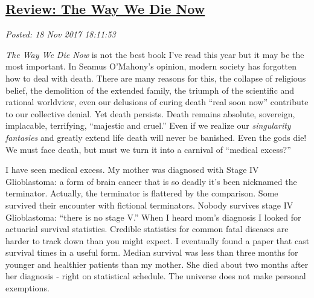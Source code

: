 %

\subsection*{\href{http://analyzethedatanotthedrivel.org/2017/11/18/review-the-way-we-die-now/}{Review: The Way We Die Now}}


\noindent\emph{Posted: 18 Nov 2017 18:11:53}
\vspace{6pt}




\emph{The Way We Die Now} is not the best book I've read this year but it
may be the most important. In Seamus O'Mahony's opinion, modern society
has forgotten how to deal with death. There are many reasons for this,
the collapse of religious belief, the demolition of the extended family,
the triumph of the scientific and rational worldview, even our delusions
of curing death ``real soon now'' contribute to our collective denial.
Yet death persists. Death remains absolute, sovereign, implacable,
terrifying, ``majestic and cruel.'' Even if we realize our
\emph{singularity fantasies} and greatly extend life death will never be
banished. Even the gods die! We must face death, but must we turn it
into a carnival of ``medical excess?''

I have seen medical excess. My mother was diagnosed with Stage IV
Glioblastoma: a form of brain cancer that is so deadly it's been
nicknamed the terminator. Actually, the terminator is flattered by the
comparison. Some survived their encounter with fictional terminators.
Nobody survives stage IV Glioblastoma: ``there is no stage V.'' When I
heard mom's diagnosis I looked for actuarial survival statistics.
Credible statistics for common fatal diseases are harder to track down
than you might expect. I eventually found a paper that cast survival
times in a useful form. Median survival was less than three months for
younger and healthier patients than my mother. She died about two months
after her diagnosis - right on statistical schedule. The universe does
not make personal exemptions.


